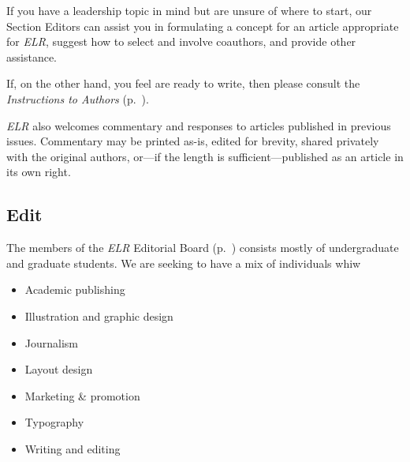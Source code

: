 If you have a leadership topic in mind but are unsure of where to start, our Section Editors can assist you in formulating a concept for an article appropriate for \emph{ELR}, suggest how to select and involve coauthors, and provide other assistance.

If, on the other hand, you feel are ready to write, then please consult the \emph{Instructions to Authors} (p.~\pageref{authorguide}).

\emph{ELR} also welcomes commentary and responses to articles published in previous issues.
Commentary may be printed as-is, edited for brevity, shared privately with the original authors, or---if the length is sufficient---published as an article in its own right.

\subsection{Edit}
The members of the \emph{ELR} Editorial Board (p.~\pageref{masthead}) consists mostly of undergraduate and graduate students.
We are seeking to have a mix of individuals whiw
\begin{multicols}{2}
  \begin{itemize}
    \item Academic publishing
    \item Illustration and graphic design
    \item Journalism
    \item Layout design
    \item Marketing \& promotion
    \item Typography
    \item Writing and editing
  \end{itemize}
\end{multicols}
